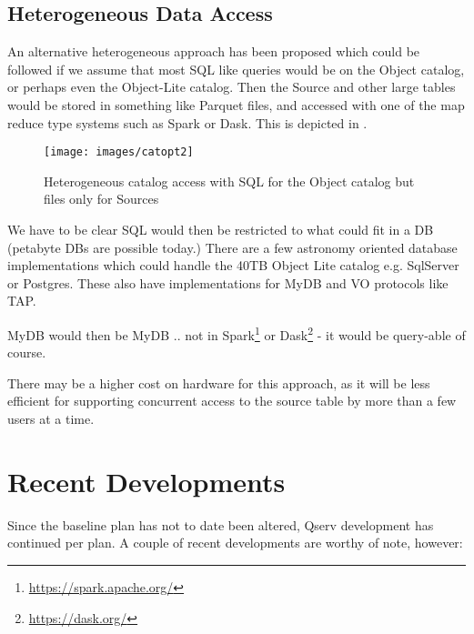 \subsection{Heterogeneous Data Access}
 An alternative heterogeneous approach has been proposed which could be followed if we assume that most SQL like queries would be on the Object catalog, or perhaps even the Object-Lite catalog.  Then the Source and other large tables would be stored in something like Parquet files, and accessed with one of the map reduce type systems such as Spark or Dask. This is depicted in .

\begin{figure}
\begin{center}
 \texttt{[image: images/catopt2]}
\caption{ Heterogeneous catalog access with SQL for the Object catalog but files only for Sources \label{fig:catopt2}}
\end{center}
\end{figure}

We have to be clear SQL would then be restricted to what could fit in a DB (petabyte DBs are possible today.)
There are a few astronomy oriented database implementations which could handle the 40TB Object Lite catalog e.g. SqlServer or Postgres. These also have implementations for MyDB and VO protocols like TAP.

MyDB would then be MyDB .. not in Spark\footnote{\url{https://spark.apache.org/}} or Dask\footnote{\url{https://dask.org/}} - it would be query-able of course.

There may be a higher cost on hardware for this approach, as it will be less efficient for supporting concurrent access to the source table by more than a few users at a time.

\section {Recent Developments}

Since the baseline plan has not to date been altered, Qserv development has continued per plan.  A couple of recent developments are worthy of note, however:

